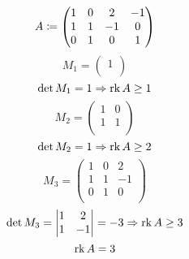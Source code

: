 \begin{example}
  $$
    A\coloneqq
    \begin{pmatrix}
      1 & 0 & 2  & -1 \\
      1 & 1 & -1 & 0  \\
      0 & 1 & 0  & 1  \\
    \end{pmatrix}
  $$
  $$
    M_1=
    \begin{pmatrix}
      1 \\
    \end{pmatrix}
  $$
  $$\det M_1 = 1\Rightarrow \operatorname{rk} A\ge 1$$
  $$
    M_2=
    \begin{pmatrix}
      1 & 0 \\
      1 & 1 \\
    \end{pmatrix}
  $$
  $$
    \det M_2 = 1\Rightarrow \operatorname{rk} A\ge 2
  $$
  $$
    M_3=
    \begin{pmatrix}
      1 & 0 & 2  \\
      1 & 1 & -1 \\
      0 & 1 & 0  \\
    \end{pmatrix}
  $$
  $$
    \det M_3=
    \begin{vmatrix}
      1 & 2  \\
      1 & -1 \\
    \end{vmatrix}
    =-3\Rightarrow \operatorname{rk} A\ge 3
  $$
  $$\operatorname{rk} A = 3$$
\end{example}


